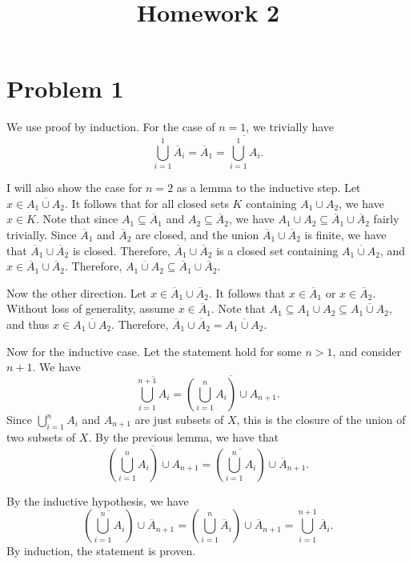 \documentclass[11pt, letterpaper]{article}
\title{Homework 2}
\begin{document}
\makeproblem
\section*{Problem 1}
We use proof by induction. For the case of $n=1$, we trivially have
\[
	\bigcup_{i=1}^1 \overline{A}_i = \overline{A}_1 = \overline{\bigcup_{i=1}^1 A_i} 
.\]

I will also show the case for $n=2$ as a lemma to the inductive step. Let $x\in \overline{A_1\cup A_2} $. It follows that for all closed sets $K$ containing $A_1\cup A_2$, we have $x\in K$. Note that since $A_1\subseteq \overline{A}_1 $ and $A_2\subseteq \overline{A}_2 $, we have $A_1\cup A_2 \subseteq \overline{A} _1 \cup \overline{A} _2$ fairly trivially. Since $\overline{A}_1$ and $\overline{A}_2$ are closed, and the union $\overline{A} _1 \cup \overline{A} _2$ is finite, we have that $\overline{A} _1\cup \overline{A} _2$ is closed. Therefore, $\overline{A} _1 \cup \overline{A} _2$ is a closed set containing $\overline{A_1\cup A_2} $, and $x\in \overline{A} _1 \cup \overline{A}_2$. Therefore, $\overline{A_1 \cup A_2} \subseteq \overline{A}_1 \cup \overline{A} _2$.

Now the other direction. Let $x\in \overline{A} _1\cup \overline{A} _2$. It follows that $x\in \overline{A} _1$ or $x\in \overline{A} _{2} $. Without loss of generality, assume $x\in \overline{A} _1$. Note that $A_1 \subseteq A_1 \cup A_2\subseteq \overline{A_1\cup A_2} $, and thus $x\in \overline{A_1\cup A_2} $. Therefore, $\overline{A} _1\cup \overline{A} _2=\overline{A_1\cup A_2} $.

Now for the inductive case. Let the statement hold for some $n>1$, and consider $n+1$. We have
\[
	\overline{\bigcup_{i=1}^{n+1} A_i} =\overline{\left(\bigcup_{i=1}^n A_i\right) \cup A_{n+1} } 
.\]
Since $\bigcup_{i=1}^n A_i$ and $A_{n+1} $ are just subsets of $X$, this is the closure of the union of two subsets of $X$. By the previous lemma, we have that
\[
	\overline{\left( \bigcup_{i=1}^n A_i \right) \cup A_{n+1} } =\left( \overline{\bigcup_{i=1}^n A_i}  \right) \cup \overline{A}_{n+1} 
.\]

By the inductive hypothesis, we have
\[
	\left( \overline{\bigcup_{i=1}^n A_i}  \right) \cup \overline{A}_{n+1} =\left( \bigcup_{i=1}^n \overline{A}_i \right) \cup \overline{A} _{n+1} =\bigcup_{i=1}^{n+1} \overline{A}_i
.\]
By induction, the statement is proven.
\end{document}
